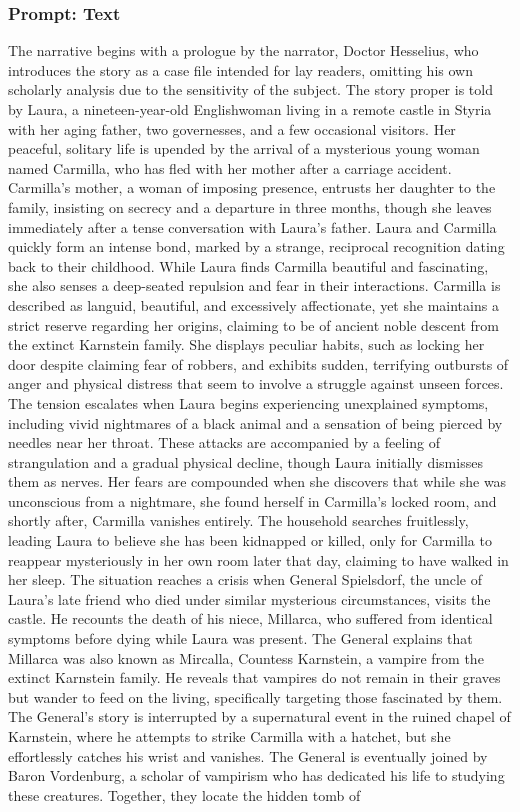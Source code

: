 \documentclass{article} %
\begin{document}
\subsubsection{Prompt: Text}

The narrative begins with a prologue by the narrator, Doctor Hesselius, who introduces the story as a case file intended for lay readers, omitting his own scholarly analysis due to the sensitivity of the subject. The story proper is told by Laura, a nineteen-year-old Englishwoman living in a remote castle in Styria with her aging father, two governesses, and a few occasional visitors. Her peaceful, solitary life is upended by the arrival of a mysterious young woman named Carmilla, who has fled with her mother after a carriage accident. Carmilla's mother, a woman of imposing presence, entrusts her daughter to the family, insisting on secrecy and a departure in three months, though she leaves immediately after a tense conversation with Laura's father. Laura and Carmilla quickly form an intense bond, marked by a strange, reciprocal recognition dating back to their childhood. While Laura finds Carmilla beautiful and fascinating, she also senses a deep-seated repulsion and fear in their interactions. Carmilla is described as languid, beautiful, and excessively affectionate, yet she maintains a strict reserve regarding her origins, claiming to be of ancient noble descent from the extinct Karnstein family. She displays peculiar habits, such as locking her door despite claiming fear of robbers, and exhibits sudden, terrifying outbursts of anger and physical distress that seem to involve a struggle against unseen forces. The tension escalates when Laura begins experiencing unexplained symptoms, including vivid nightmares of a black animal and a sensation of being pierced by needles near her throat. These attacks are accompanied by a feeling of strangulation and a gradual physical decline, though Laura initially dismisses them as nerves. Her fears are compounded when she discovers that while she was unconscious from a nightmare, she found herself in Carmilla's locked room, and shortly after, Carmilla vanishes entirely. The household searches fruitlessly, leading Laura to believe she has been kidnapped or killed, only for Carmilla to reappear mysteriously in her own room later that day, claiming to have walked in her sleep. The situation reaches a crisis when General Spielsdorf, the uncle of Laura's late friend who died under similar mysterious circumstances, visits the castle. He recounts the death of his niece, Millarca, who suffered from identical symptoms before dying while Laura was present. The General explains that Millarca was also known as Mircalla, Countess Karnstein, a vampire from the extinct Karnstein family. He reveals that vampires do not remain in their graves but wander to feed on the living, specifically targeting those fascinated by them. The General's story is interrupted by a supernatural event in the ruined chapel of Karnstein, where he attempts to strike Carmilla with a hatchet, but she effortlessly catches his wrist and vanishes. The General is eventually joined by Baron Vordenburg, a scholar of vampirism who has dedicated his life to studying these creatures. Together, they locate the hidden tomb of 
\end{document}
